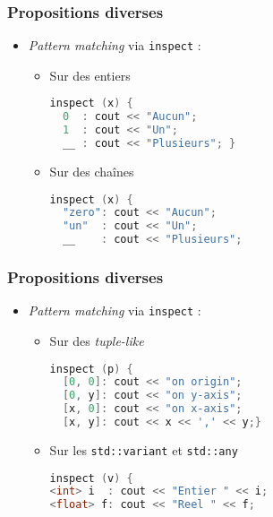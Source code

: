 \documentclass[C++.tex]{subfiles}
\begin{document}
\begin{frame}[fragile]
	\frametitle{Propositions diverses}
	\begin{itemize}
		\item \textit{Pattern matching} via \lstinline|inspect| :
		\begin{itemize}
			\item Sur des entiers

			\begin{lstlisting}[language=C++]
inspect (x) {
  0  : cout << "Aucun";
  1  : cout << "Un";
  __ : cout << "Plusieurs"; }\end{lstlisting}


			\item Sur des chaînes

			\begin{lstlisting}[language=C++]
inspect (x) {
  "zero": cout << "Aucun";
  "un"  : cout << "Un";
  __    : cout << "Plusieurs";\end{lstlisting}
		\end{itemize}
	\end{itemize}
\end{frame}

\begin{frame}[fragile]
	\frametitle{Propositions diverses}
	\begin{itemize}
		\item \textit{Pattern matching} via \lstinline|inspect| :
		\begin{itemize}
			\item Sur des \textit{tuple-like}


			\begin{lstlisting}[language=C++]
inspect (p) {
  [0, 0]: cout << "on origin";
  [0, y]: cout << "on y-axis";
  [x, 0]: cout << "on x-axis";
  [x, y]: cout << x << ',' << y;}\end{lstlisting}

			\item Sur les \lstinline|std::variant| et \lstinline|std::any|

			\begin{lstlisting}[language=C++]
inspect (v) {
<int> i  : cout << "Entier " << i;
<float> f: cout << "Reel " << f;\end{lstlisting}
		\end{itemize}
	\end{itemize}
\end{frame}
\end{document}
